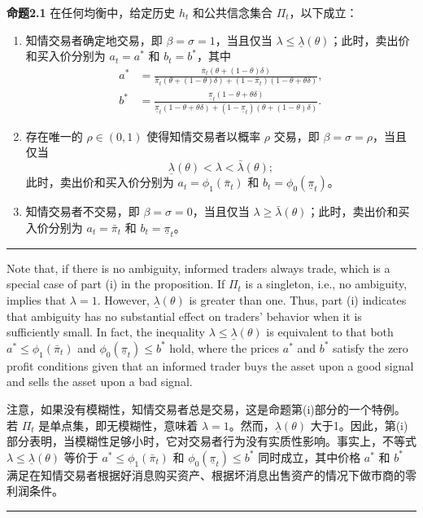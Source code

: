 \documentclass[12pt,a4paper]{article}
\newenvironment{original}{%
  \par\vspace{4pt}\noindent%
  \color{black}%
  \ignorespaces
}{%
  \par\vspace{2pt}%
}
\newenvironment{translation}{%
  \par\vspace{2pt}\noindent%
  \color{transblue}%
  \ignorespaces
}{%
  \par\vspace{4pt}\hrule\vspace{6pt}%
}
\begin{document}
\begin{translation}
\textbf{命题2.1} 在任何均衡中，给定历史 $h_t$ 和公共信念集合 $\Pi_t$，以下成立：
\begin{enumerate}[label=(\roman*)]
\item 知情交易者确定地交易，即 $\beta = \sigma = 1$，当且仅当 $\lambda \leq \underline{\lambda}(\theta)$；此时，卖出价和买入价分别为 $a_t = a^*$ 和 $b_t = b^*$，其中
\begin{align}
a^* &= \frac{\bar{\pi}_t(\theta + (1-\theta)\delta)}{\bar{\pi}_t(\theta + (1-\theta)\delta) + (1-\bar{\pi}_t)(1-\theta+\theta\delta)}, \tag{2.5}\\
b^* &= \frac{\underline{\pi}_t(1-\theta + \theta\delta)}{\underline{\pi}_t(1-\theta + \theta\delta) + (1-\underline{\pi}_t)(\theta+(1-\theta)\delta)}. \tag{2.6}
\end{align}
\item 存在唯一的 $\rho \in (0, 1)$ 使得知情交易者以概率 $\rho$ 交易，即 $\beta = \sigma = \rho$，当且仅当
\[
\underline{\lambda}(\theta) < \lambda < \bar{\lambda}(\theta); \tag{2.7}
\]
此时，卖出价和买入价分别为 $a_t = \phi_1(\bar{\pi}_t)$ 和 $b_t = \phi_0(\underline{\pi}_t)$。
\item 知情交易者不交易，即 $\beta = \sigma = 0$，当且仅当 $\lambda \geq \bar{\lambda}(\theta)$；此时，卖出价和买入价分别为 $a_t = \bar{\pi}_t$ 和 $b_t = \underline{\pi}_t$。
\end{enumerate}
\end{translation}

\begin{original}
Note that, if there is no ambiguity, informed traders always trade, which is a special case of part (i) in the proposition. If $\Pi_t$ is a singleton, i.e., no ambiguity, implies that $\lambda = 1$. However, $\underline{\lambda}(\theta)$ is greater than one. Thus, part (i) indicates that ambiguity has no substantial effect on traders' behavior when it is sufficiently small. In fact, the inequality $\lambda \leq \underline{\lambda}(\theta)$ is equivalent to that both $a^* \leq \phi_1(\bar{\pi}_t)$ and $\phi_0(\underline{\pi}_t) \leq b^*$ hold, where the prices $a^*$ and $b^*$ satisfy the zero profit conditions given that an informed trader buys the asset upon a good signal and sells the asset upon a bad signal.
\end{original}
\begin{translation}
注意，如果没有模糊性，知情交易者总是交易，这是命题第(i)部分的一个特例。若 $\Pi_t$ 是单点集，即无模糊性，意味着 $\lambda = 1$。然而，$\underline{\lambda}(\theta)$ 大于1。因此，第(i)部分表明，当模糊性足够小时，它对交易者行为没有实质性影响。事实上，不等式 $\lambda \leq \underline{\lambda}(\theta)$ 等价于 $a^* \leq \phi_1(\bar{\pi}_t)$ 和 $\phi_0(\underline{\pi}_t) \leq b^*$ 同时成立，其中价格 $a^*$ 和 $b^*$ 满足在知情交易者根据好消息购买资产、根据坏消息出售资产的情况下做市商的零利润条件。
\end{translation}
\end{document}
